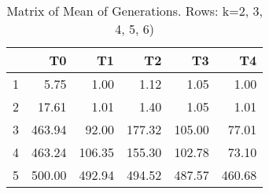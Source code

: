 \begin{table}[ht]
\centering
\begin{tabular}{rrrrrr}
  \hline
 & T0 & T1 & T2 & T3 & T4 \\ 
  \hline
1 & 5.75 & 1.00 & 1.12 & 1.05 & 1.00 \\ 
  2 & 17.61 & 1.01 & 1.40 & 1.05 & 1.01 \\ 
  3 & 463.94 & 92.00 & 177.32 & 105.00 & 77.01 \\ 
  4 & 463.24 & 106.35 & 155.30 & 102.78 & 73.10 \\ 
  5 & 500.00 & 492.94 & 494.52 & 487.57 & 460.68 \\ 
   \hline
\end{tabular}
\caption{Matrix of Mean of Generations.  Rows: k=2, 3, 4, 5, 6)} 
\end{table}
